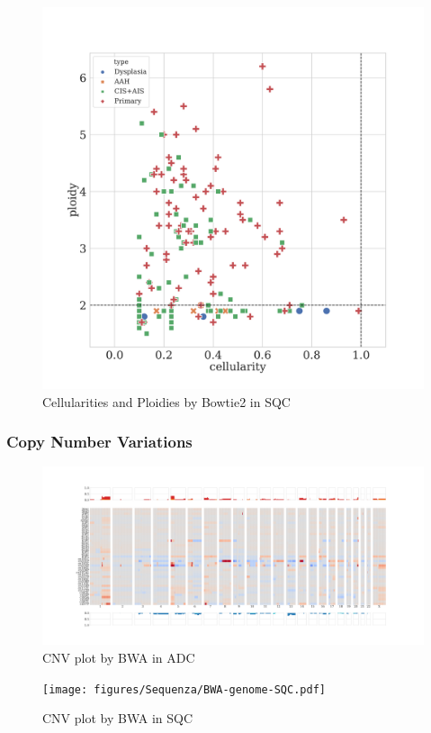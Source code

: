 \documentclass[11pt,a4paper,onecolumn,oneside]{report}
\begin{document}
                \begin{figure}[p]
                    \centering
                    \includegraphics[width=0.6 \linewidth]{figures/Sequenza/Bowtie2-sequenza-SQC.pdf}
                    \caption{Cellularities and Ploidies by Bowtie2 in SQC}
                    \label{fig:sequenza-Bowtie2-SQC}
                \end{figure}

            \subsubsection{Copy Number Variations}
                \begin{figure}[p]
                    \centering
                    \includegraphics[width=\linewidth]{figures/Sequenza/BWA-genome-ADC.pdf}
                    \caption{CNV plot by BWA in ADC}
                    \label{fig:CNV-BWA-ADC}
                \end{figure}

                \begin{figure}[p]
                    \centering
                    \texttt{[image: figures/Sequenza/BWA-genome-SQC.pdf]}
                    \caption{CNV plot by BWA in SQC}
                    \label{fig:CNV-BWA-SQC}
                \end{figure}
\end{document}
